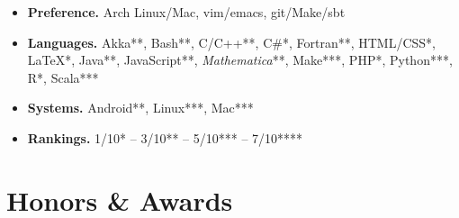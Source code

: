 \documentclass[11pt,letter,sans]{moderncv}
\begin{document}
    \begin{itemize}
  
    \item { \bf Preference. } Arch Linux/Mac, vim/emacs, git/Make/sbt
  
    \item { \bf Languages. } Akka**, Bash**, C/C++**, C\#*, Fortran**, HTML/CSS*, \LaTeX**, Java**, JavaScript**, {\it Mathematica}**, Make***, PHP*, Python***, R*, Scala***
  
    \item { \bf Systems. } Android**, Linux***, Mac***
  
    \item { \bf Rankings. } 1/10* -- 3/10** -- 5/10*** -- 7/10****
  
    \end{itemize}
\section{ Honors \& Awards }
\end{document}
